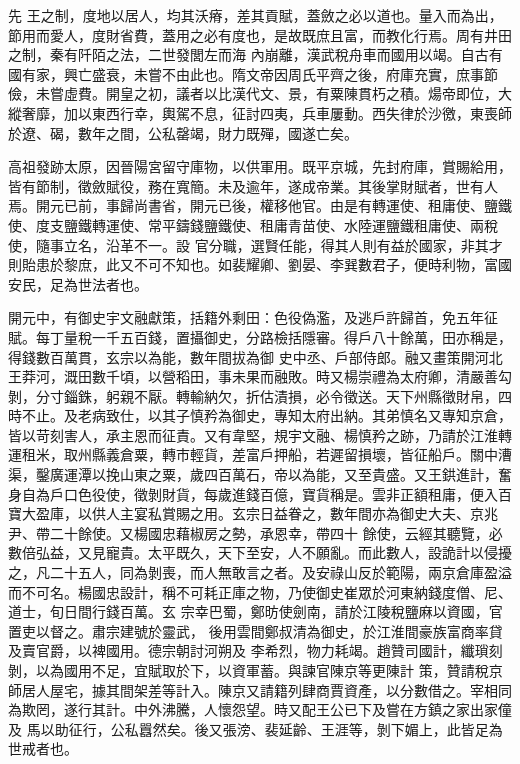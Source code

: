 
\begin{pinyinscope}

 先
 王之制，度地以居人，均其沃瘠，差其貢賦，蓋斂之必以道也。量入而為出，節用而愛人，度財省費，蓋用之必有度也，是故既庶且富，而教化行焉。周有井田之制，秦有阡陌之法，二世發閭左而海
 內崩離，漢武稅舟車而國用以竭。自古有國有家，興亡盛衰，未嘗不由此也。隋文帝因周氏平齊之後，府庫充實，庶事節儉，未嘗虛費。開皇之初，議者以比漢代文、景，有粟陳貫朽之積。煬帝即位，大縱奢靡，加以東西行幸，輿駕不息，征討四夷，兵車屢動。西失律於沙徼，東喪師於遼、碣，數年之間，公私罄竭，財力既殫，國遂亡矣。



 高祖發跡太原，因晉陽宮留守庫物，以供軍用。既平京城，先封府庫，賞賜給用，皆有節制，徵斂賦役，務在寬簡。未及逾年，遂成帝業。其後掌財賦者，世有人焉。開元已前，事歸尚書省，開元已後，權移他官。由是有轉運使、租庸使、鹽鐵使、度支鹽鐵轉運使、常平鑄錢鹽鐵使、租庸青苗使、水陸運鹽鐵租庸使、兩稅使，隨事立名，沿革不一。設
 官分職，選賢任能，得其人則有益於國家，非其才則貽患於黎庶，此又不可不知也。如裴耀卿、劉晏、李巽數君子，便時利物，富國安民，足為世法者也。



 開元中，有御史宇文融獻策，括籍外剩田：色役偽濫，及逃戶許歸首，免五年征賦。每丁量稅一千五百錢，置攝御史，分路檢括隱審。得戶八十餘萬，田亦稱是，得錢數百萬貫，玄宗以為能，數年間拔為御
 史中丞、戶部侍郎。融又畫策開河北王莽河，溉田數千頃，以營稻田，事未果而融敗。時又楊崇禮為太府卿，清嚴善勾剝，分寸錙銖，躬親不厭。轉輸納欠，折估漬損，必令徵送。天下州縣徵財帛，四時不止。及老病致仕，以其子慎矜為御史，專知太府出納。其弟慎名又專知京倉，皆以苛刻害人，承主恩而征責。又有韋堅，規宇文融、楊慎矜之跡，乃請於江淮轉運租米，取州縣義倉粟，轉市輕貨，差富戶押船，若遲留損壞，皆征船戶。關中漕渠，鑿廣運潭以挽山東之粟，歲四百萬石，帝以為能，又至貴盛。又王鉷進計，奮身自為戶口色役使，徵剝財貨，每歲進錢百億，寶貨稱是。雲非正額租庸，便入百寶大盈庫，以供人主宴私賞賜之用。玄宗日益眷之，數年間亦為御史大夫、京兆尹、帶二十餘使。又楊國忠藉椒房之勢，承恩幸，帶四十
 餘使，云經其聽覽，必數倍弘益，又見寵貴。太平既久，天下至安，人不願亂。而此數人，設詭計以侵擾之，凡二十五人，同為剝喪，而人無敢言之者。及安祿山反於範陽，兩京倉庫盈溢而不可名。楊國忠設計，稱不可耗正庫之物，乃使御史崔眾於河東納錢度僧、尼、道士，旬日間行錢百萬。玄
 宗幸巴蜀，鄭昉使劍南，請於江陵稅鹽麻以資國，官置吏以督之。肅宗建號於靈武，
 後用雲間鄭叔清為御史，於江淮間豪族富商率貸及賣官爵，以裨國用。德宗朝討河朔及
 李希烈，物力耗竭。趙贊司國計，纖瑣刻剝，以為國用不足，宜賦取於下，以資軍蓄。與諫官陳京等更陳計
 策，贊請稅京師居人屋宅，據其間架差等計入。陳京又請籍列肆商賈資產，以分數借之。宰相同為欺罔，遂行其計。中外沸騰，人懷怨望。時又配王公已下及嘗在方鎮之家出家僮及
 馬以助征行，公私囂然矣。後又張滂、裴延齡、王涯等，剝下媚上，此皆足為世戒者也。




\end{pinyinscope}
